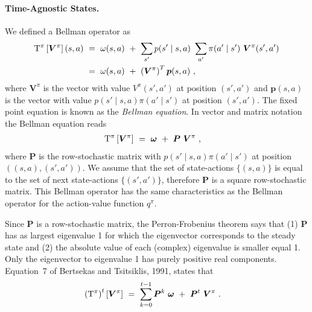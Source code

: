 \documentclass{article}
\newcommand\Bp{\bm{p}}
\newcommand\BP{\bm{P}}
\newcommand\BV{\bm{V}}
\newcommand\Bom{\bm{\omega}}
\begin{document}
\begin{appendices}
\paragraph{Time-Agnostic States.}


We defined a Bellman operator as
\begin{align}
  \rT^\pi \left[ \BV^{\pi} \right] (s,a)   \ &= \ \omega(s,a)
  \ + \  \sum_{s'} p(s'\mid s,a) \ \sum_{a'}
  \pi(a' \mid s') \ \BV^{\pi}(s',a')  \\ \nonumber
  &= \  \omega(s,a) \ + \ \left(  \BV^{\pi} \right)^T  \Bp(s,a) \ ,
\end{align}
where $\BV^{\pi}$ is the vector with value $V^{\pi}(s',a')$ at position $(s',a')$
and $\Bp(s,a)$ is the vector with value
$p(s'\mid s,a)\pi(a' \mid s')$ at position $(s',a')$. The fixed point equation is known as
the {\em Bellman equation}. In vector and matrix notation
the Bellman equation reads
\begin{align}
  \rT^\pi \left[ \BV^{\pi} \right]    \ &= \ \Bom
  \ + \  \BP \ \BV^{\pi}  \ ,
\end{align}
where $\BP$ is the row-stochastic matrix with
$p(s'\mid s,a)\pi(a' \mid s')$ at position $((s,a),(s',a'))$.
We assume that the set of state-actions $\{(s,a)\}$ is equal to the set
of next state-actions $\{(s',a')\}$, therefore $\BP$ is a square
row-stochastic matrix.
This Bellman operator has the same characteristics as the Bellman
operator for the action-value function $q^{\pi}$.

Since $\BP$ is a row-stochastic matrix, the
Perron-Frobenius theorem says
that (1) $\BP$ has as largest eigenvalue 1 for which
the eigenvector corresponds to the steady state and
(2) the absolute value of each (complex) eigenvalue is smaller equal 1.
Only the eigenvector to eigenvalue 1 has purely positive real components.
Equation~7 of Bertsekas and Tsitsiklis, 1991, \cite{Bertsekas:91}
states that
\begin{align}
  \label{eq:tfold}
  \left(\rT^\pi \right)^t \left[ \BV^{\pi} \right]    \ &= \
  \sum_{k=0}^{t-1}  \BP^k \ \Bom
  \ + \  \BP^t \ \BV^{\pi}  \ .
\end{align}


\end{appendices}
\end{document}
